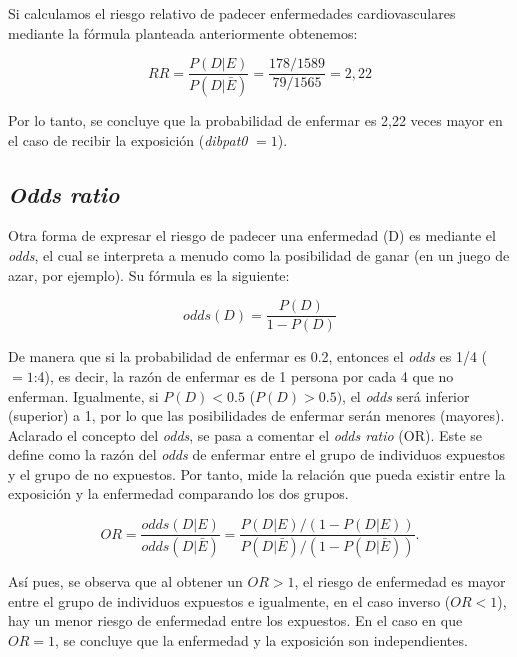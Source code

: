 Si calculamos el riesgo relativo de padecer enfermedades cardiovasculares mediante la fórmula planteada anteriormente obtenemos:

\begin{equation*}
RR=\frac{P(D|E)}{P(D|\bar{E})}=\frac{178/1589}{79/1565}=2,22
\end{equation*}

Por lo tanto, se concluye que la probabilidad de enfermar es 2,22 veces mayor en el caso de recibir la exposición (\textit{dibpat0} $=1$). \\

\subsection{\textit{Odds ratio}}\label{OR}
Otra forma de expresar el riesgo de padecer una enfermedad (D) es mediante el \textit{odds}, el cual se interpreta a menudo como la posibilidad de ganar (en un juego de azar, por ejemplo). Su fórmula es la siguiente:

\begin{equation*}
odds(D)=\frac{P(D)}{1-P(D)}
\end{equation*}

De manera que si la probabilidad de enfermar es 0.2, entonces el \textit{odds} es 1/4 ($=1$:4), es decir, la razón de enfermar es de 1 persona por cada 4 que no enferman. Igualmente, si $P(D)<0.5$ ($P(D)>0.5)$, el \textit{odds} será inferior (superior) a 1, por lo que las posibilidades de enfermar serán menores (mayores).\\

Aclarado el concepto del \textit{odds}, se pasa a comentar el \textit{odds ratio} (OR). Este se define como la razón del \textit{odds} de enfermar entre el grupo de individuos expuestos y el grupo de no expuestos. Por tanto, mide la relación que pueda existir entre la exposición y la enfermedad comparando los dos grupos.

\begin{equation}
\label{eq:or}
OR=\frac{odds(D|E)}{odds(D|\bar{E})}=\frac{P(D|E)/(1-P(D|E))}{P(D|\bar{E})/(1-P(D|\bar{E}))}.
\end{equation}

Así pues, se observa que al obtener un $OR>1$, el riesgo de enfermedad es mayor entre el grupo de individuos expuestos e igualmente, en el caso inverso ($OR<1$), hay un menor riesgo de enfermedad entre los expuestos. En el caso en que $OR=1$, se concluye que la enfermedad y la exposición son independientes.\\


